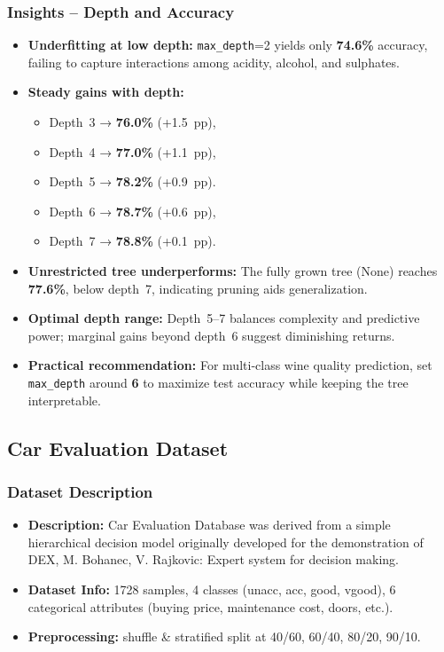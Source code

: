 \subsubsection*{Insights – Depth and Accuracy}
\begin{itemize}
	\item \textbf{Underfitting at low depth:}
	      \texttt{max\_depth}=2 yields only \textbf{74.6\%} accuracy, failing to capture interactions among acidity, alcohol, and sulphates.
	\item \textbf{Steady gains with depth:}
	      \begin{itemize}
		      \item Depth 3 → \textbf{76.0\%} (+1.5 pp),
		      \item Depth 4 → \textbf{77.0\%} (+1.1 pp),
		      \item Depth 5 → \textbf{78.2\%} (+0.9 pp).
		      \item Depth 6 → \textbf{78.7\%} (+0.6 pp),
		      \item Depth 7 → \textbf{78.8\%} (+0.1 pp).
	      \end{itemize}
	\item \textbf{Unrestricted tree underperforms:}
	      The fully grown tree (None) reaches \textbf{77.6\%}, below depth 7, indicating pruning aids generalization.
	\item \textbf{Optimal depth range:}
	      Depth 5–7 balances complexity and predictive power; marginal gains beyond depth 6 suggest diminishing returns.
	\item \textbf{Practical recommendation:}
	      For multi‑class wine quality prediction, set \texttt{max\_depth} around \textbf{6} to maximize test accuracy while keeping the tree interpretable.
\end{itemize}


\clearpage
\subsection{Car Evaluation Dataset}
\subsubsection*{Dataset Description}
\begin{itemize}
	\item \textbf{Description:} Car Evaluation Database was derived from a simple hierarchical decision model originally developed for the demonstration of DEX, M. Bohanec, V. Rajkovic: Expert system for decision making.
	\item \textbf{Dataset Info:} 1728 samples, 4 classes (unacc, acc, good, vgood), 6 categorical attributes (buying price, maintenance cost, doors, etc.).
	\item \textbf{Preprocessing:} shuffle \& stratified split at 40/60, 60/40, 80/20, 90/10.
\end{itemize}

